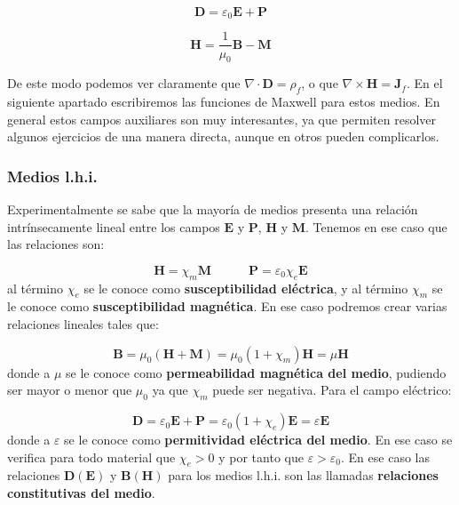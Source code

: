 \documentclass[12pt,a4paper]{article}
\newcommand{\tquad}{\quad \quad \quad}
\newcommand{\rota}{\nabla \times}
\newcommand{\dive}{\nabla \cdot}
\newcommand{\Bn}{\mathbf{B}}
\newcommand{\En}{\mathbf{E}}
\newcommand{\Dn}{\mathbf{D}}
\newcommand{\Hn}{\mathbf{H}}
\newcommand{\Jn}{\mathbf{J}}
\newcommand{\Pn}{\mathbf{P}}
\newcommand{\Mn}{\mathbf{M}}
\numberwithin{equation}{section}
\numberwithin{figure}{section}
\begin{document}
\begin{equation}
\Dn = \varepsilon_0 \En + \Pn
\end{equation}

\begin{equation}
\Hn = \dfrac{1}{\mu_0} \Bn - \Mn
\end{equation}

De este modo podemos ver claramente que $\dive \Dn = \rho_f$, o que $\rota \Hn = \Jn_f$. En el siguiente apartado escribiremos las funciones de Maxwell para estos medios. En general estos campos auxiliares son muy interesantes, ya que permiten resolver algunos ejercicios de una manera directa, aunque en otros pueden complicarlos. \\

\subsubsection{Medios l.h.i.}

Experimentalmente se sabe que la mayoría de medios presenta una relación intrínsecamente lineal entre los campos $\En$ y $\Pn$, $\Hn$ y $\Mn$. Tenemos en ese caso que las relaciones son:

\begin{equation}
\Hn = \chi_m \Mn \tquad \Pn =  \varepsilon_0 \chi_e \En
\end{equation}
al término $\chi_e$ se le conoce como \textbf{susceptibilidad eléctrica}, y al término $\chi_m$ se le conoce como \textbf{susceptibilidad magnética}. En ese caso podremos crear varias relaciones lineales tales que:

\begin{equation}
\Bn = \mu_0 (\Hn + \Mn) = \mu_0 (1 + \chi_m) \Hn = \mu \Hn\label{Ec:01.4.31}
\end{equation}
donde a $\mu$ se le conoce como \textbf{permeabilidad magnética del medio}, pudiendo ser mayor o menor que $\mu_0$ ya que $\chi_m$ puede ser negativa. Para el campo eléctrico:

\begin{equation}
\Dn = \varepsilon_0 \En + \Pn = \varepsilon_0(1+\chi_e) \En = \varepsilon \En \label{Ec:01.4.32}
\end{equation}
donde a $\varepsilon$ se le conoce como \textbf{permitividad eléctrica del medio}. En ese caso se verifica para todo material que $\chi_e>0$ y por tanto que $\varepsilon>\varepsilon_0$. En ese caso las relaciones $\Dn ( \En)$ y $\Bn ( \Hn)$ para los medios l.h.i. son las llamadas \textbf{relaciones constitutivas del medio}.
\end{document}
